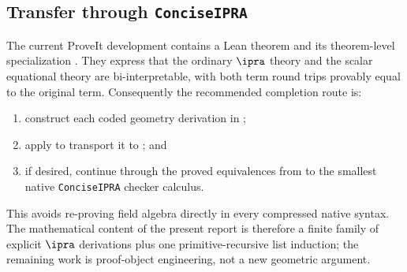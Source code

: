 \subsection{Transfer through \texttt{ConciseIPRA}}

The current ProveIt development contains a Lean theorem
 and its theorem-level specialization
.  They express that the ordinary $\ipra$ theory
 and the scalar equational theory  are
bi-interpretable, with both term round trips provably equal to the original
term.  Consequently the recommended completion route is:
\begin{enumerate}
\item construct each coded geometry derivation in ;
\item apply  to transport it to ; and
\item if desired, continue through the proved equivalences from
       to the smallest native \texttt{ConciseIPRA} checker
      calculus.
\end{enumerate}
This avoids re-proving field algebra directly in every compressed native
syntax.  The mathematical content of the present report is therefore a
finite family of explicit $\ipra$ derivations plus one primitive-recursive
list induction; the remaining work is proof-object engineering, not a new
geometric argument.
